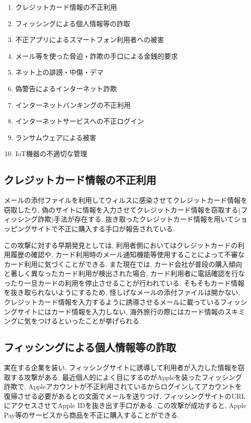 \documentclass{jsarticle}
\begin{document}
\begin{enumerate}
	\item クレジットカード情報の不正利用
	\item フィッシングによる個人情報等の詐取
	\item 不正アプリによるスマートフォン利用者への被害
	\item メール等を使った脅迫・詐欺の手口による金銭的要求
	\item ネット上の誹謗・中傷・デマ
	\item 偽警告によるインターネット詐欺
	\item インターネットバンキングの不正利用
	\item インターネットサービスへの不正ログイン
	\item ランサムウェアによる被害
	\item IoT機器の不適切な管理
\end{enumerate}

\subsection{クレジットカード情報の不正利用}
メールの添付ファイルを利用してウィルスに感染させてクレジットカード情報を窃取したり, 偽のサイトに情報を入力させてクレジットカード情報を窃取する(フィッシング詐欺)手法が存在する. 抜き取ったクレジットカード情報を用いてショッピングサイトで不正に購入する手口が報告されている.

この攻撃に対する早期発見としては, 利用者側においてはクレジットカードの利用履歴の確認や, カード利用時のメール通知機能等使用することによって不審なカード利用に気づくことができる. また現在では, カード会社が普段の購入傾向と著しく異なったカード利用が検出された場合, カード利用者に電話確認を行なったり一旦カードの利用を停止させることが行われている. そもそもカード情報を抜き取られないようにするため, 怪しげなメールの添付ファイルは開かない, クレジットカード情報を入力するように誘導させるメールに載っているフィッシングサイトにはカード情報を入力しない, 海外旅行の際にはカード情報のスキミングに気をつけるといったことが挙げられる.

\subsection{フィッシングによる個人情報等の詐取}
実在する企業を装い, フィッシングサイトに誘導して利用者が入力した情報を窃取する攻撃がある. 最近個人的によく目にするのがAppleを装ったフィッシング詐欺で, Appleアカウントが不正利用されているからログインしてアカウントを復帰させる必要があるとの文面でメールを送りつけ, フィッシングサイトのURLにアクセスさせてApple IDを抜き出す手口がある. この攻撃が成功すると, Apple Pay等のサービスから商品を不正に購入することができる.
\end{document}

